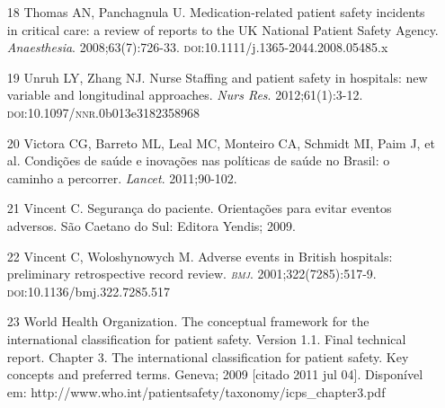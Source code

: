 \documentclass{article}
\begin{document}
\begin{itemize}
\item[18] Thomas AN, Panchagnula U. Medication-related patient safety
incidents in
critical care: a review of reports to the UK National Patient Safety Agency.
\textit{Anaesthesia}. 2008;63(7):726-33.
\textsc{doi}:10.1111/j.1365-2044.2008.05485.x

\item[19] Unruh LY, Zhang NJ. Nurse Staffing and patient safety in hospitals:
new
variable and longitudinal approaches. \textit{Nurs Res}. 2012;61(1):3-12.
\textsc{doi}:10.1097/\textsc{nnr}.0b013e3182358968

\item[20] Victora CG, Barreto ML, Leal MC, Monteiro CA, Schmidt MI, Paim J, et
al.
Condições de saúde e inovações nas políticas de saúde no Brasil: o caminho a
percorrer.
\textit{Lancet}. 2011;90-102.

\item[21] Vincent C. Segurança do paciente. Orientações para evitar eventos
adversos. São Caetano do Sul: Editora Yendis; 2009.

\item[22] Vincent C, Woloshynowych M. Adverse events in British hospitals:
preliminary retrospective record review. \textit{\textsc{bmj}}. 2001;322(7285):517-9.
\textsc{doi}:10.1136/bmj.322.7285.517

\item[23] World Health Organization. The conceptual framework for the
international
classification for patient safety. Version 1.1. Final technical report. Chapter
3. The
international classification for patient safety. Key concepts and preferred
terms. Geneva;
2009 [citado 2011 jul 04]. Disponível em:
http://www.who.int/patientsafety/taxonomy/icps\_{}chapter3.pdf

\end{itemize}


\end{document}
